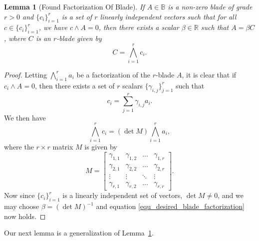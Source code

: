 \documentclass{birkjour}
\newtheorem{lem}[thm]{Lemma}
\theoremstyle{definition}
\theoremstyle{remark}
\numberwithin{equation}{section}
\newcommand{\R}{\mathbb{R}}
\newcommand{\B}{\mathbb{B}}
\begin{document}
\begin{lem}[Found Factorization Of Blade]\label{lem_desired_blade_factorization}
If $A\in\B$ is a non-zero blade of grade $r>0$ and $\{c_i\}_{i=1}^r$ is a set
of $r$ linearly independent vectors such that for all $c\in\{c_i\}_{i=1}^r$, we have
$c\wedge A=0$, then there exists a scalar $\beta\in\R$ such that $A=\beta C$,
where $C$ is an $r$-blade given by
\begin{equation}\label{equ_desired_blade_factorization}
C=\bigwedge_{i=1}^r c_i.
\end{equation}
\end{lem}
\begin{proof}
Letting $\bigwedge_{i=1}^r a_i$ be a factorization of the $r$-blade $A$, it is clear
that if $c_i\wedge A=0$, then there exists a set of $r$ scalars $\{\gamma_{i,j}\}_{j=1}^r$
such that
\begin{equation}\label{equ_c_i}
c_i=\sum_{j=1}^r\gamma_{i,j}a_i.
\end{equation}
We then have
\begin{equation}
\bigwedge_{i=1}^r c_i=(\det M)\bigwedge_{i=1}^r a_i,
\end{equation}
where the $r\times r$ matrix $M$ is given by
\begin{equation}
M = \left[\begin{array}{cccc}
\gamma_{1,1} & \gamma_{1,2} & \dots & \gamma_{1,r} \\
\gamma_{2,1} & \gamma_{2,2} & \dots & \gamma_{2,r} \\
\vdots & \vdots & \ddots & \vdots \\
\gamma_{r,1} & \gamma_{r,2} & \dots & \gamma_{r,r}
\end{array}\right].
\end{equation}
Now since $\{c_i\}_{i=1}^r$ is a linearly independent set of vectors,
$\det M\neq 0$, and we may choose $\beta=(\det M)^{-1}$ and
equation \eqref{equ_desired_blade_factorization} now holds.
\end{proof}

Our next lemma is a generalization of Lemma~\ref{lem_desired_blade_factorization}.
\end{document}
